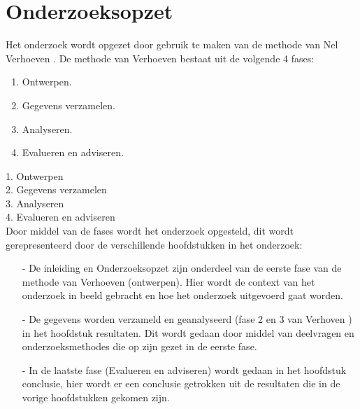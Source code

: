 \section{Onderzoeksopzet}
Het onderzoek wordt opgezet door gebruik te maken van de  methode van Nel Verhoeven \Parencite{Verhoeven}.
De methode van Verhoeven bestaat uit de volgende 4 fases:

\whitespace[2]
\begin{enumerate}
    \item Ontwerpen.
    \item Gegevens verzamelen.
    \item Analyseren.
    \item Evalueren en adviseren.
\end{enumerate}
1. Ontwerpen \\
2. Gegevens verzamelen \\
3. Analyseren \\
4. Evalueren en adviseren \\

\whitespace[2]
Door middel van de fases wordt het onderzoek opgesteld, dit wordt gerepresenteerd door de verschillende hoofdstukken in het onderzoek: \\
\begin{itemize}
	\item[-]  De inleiding en Onderzoeksopzet zijn onderdeel van de eerste fase van de methode van Verhoeven (ontwerpen).
	      Hier wordt de context van het onderzoek in beeld gebracht en hoe het onderzoek uitgevoerd gaat worden.
	\item[-] De gegevens worden verzameld en geanalyseerd (fase 2 en 3 van Verhoven \Parencite{Verhoeven}) in het hoofdstuk resultaten.
	      Dit wordt gedaan door middel van deelvragen en onderzoeksmethodes die op zijn gezet in de eerste fase.
	\item[-] In de laatste fase (Evalueren en adviseren) wordt gedaan in het hoofdstuk conclusie, hier wordt er een conclusie getrokken uit de resultaten die in de vorige hoofdstukken gekomen zijn.
\end{itemize}

